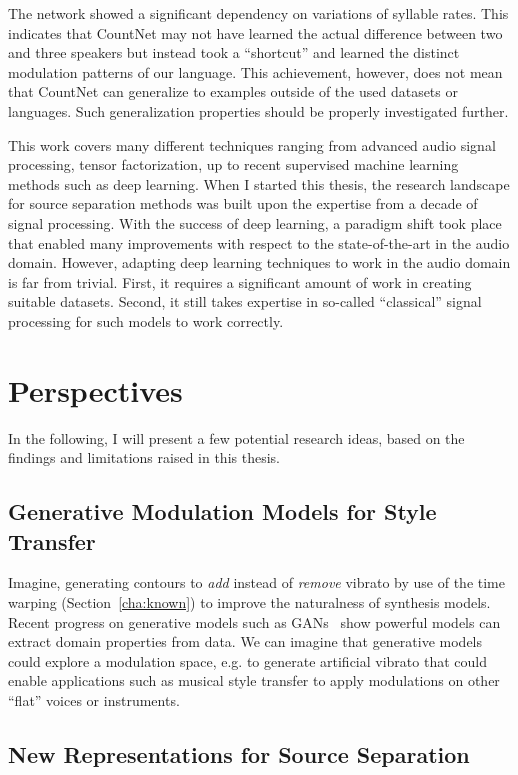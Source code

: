 The network showed a significant dependency on variations of syllable rates. This indicates that CountNet may not have learned the actual difference between two and three speakers but instead took a ``shortcut'' and learned the distinct modulation patterns of our language.
This achievement, however, does not mean that CountNet can generalize to examples outside of the used datasets or languages. Such generalization properties should be properly investigated further.
\par
This work covers many different techniques ranging from advanced audio signal processing, tensor factorization, up to recent supervised machine learning methods such as deep learning.
When I started this thesis, the research landscape for source separation methods was built upon the expertise from a decade of signal processing.
With the success of deep learning, a paradigm shift took place that enabled many improvements with respect to the state-of-the-art in the audio domain. However, adapting deep learning techniques to work in the audio domain is far from trivial. First, it requires a significant amount of work in creating suitable datasets. Second, it still takes expertise in so-called ``classical'' signal processing for such models to work correctly.

\section{Perspectives}

In the following, I will present a few potential research ideas, based on the findings and limitations raised in this thesis.

\subsection*{Generative Modulation Models for Style Transfer}
Imagine, generating contours to \emph{add} instead of \emph{remove} vibrato by use of the time warping (Section~\ref{cha:known}) to improve the naturalness of synthesis models.
Recent progress on generative models such as GANs~\cite{goodfellow14} show powerful models can extract domain properties from data.
We can imagine that generative models could explore a modulation space, e.g. to generate artificial vibrato that could enable applications such as musical style transfer to apply modulations on other ``flat'' voices or instruments.

\subsection*{New Representations for Source Separation}

